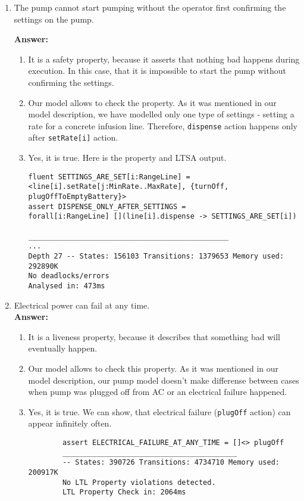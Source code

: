 \documentclass{article}
\begin{document}
\begin{enumerate}
    \item The pump cannot start pumping without the operator first confirming the settings on the pump.
    
    \textbf{Answer:}
    \begin{enumerate}
    \item It is a safety property, because it asserts that nothing bad happens during execution. In this case, that it is impossible to start the pump without confirming the settings.
    \item  Our model allows to check the property. As it was mentioned in our model description, we have modelled only one type of settings - setting a rate for a concrete infusion line. Therefore, \verb|dispense| action happens only after \verb|setRate[i]| action.
    \item Yes, it is true. Here is the property and LTSA output.
	\begin{verbatim}
fluent SETTINGS_ARE_SET[i:RangeLine] =
<line[i].setRate[j:MinRate..MaxRate], {turnOff, plugOffToEmptyBattery}>
assert DISPENSE_ONLY_AFTER_SETTINGS =
forall[i:RangeLine] [](line[i].dispense -> SETTINGS_ARE_SET[i])

_______________________________________________
...
Depth 27 -- States: 156103 Transitions: 1379653 Memory used: 292890K
No deadlocks/errors
Analysed in: 473ms
	\end{verbatim}    
    \end{enumerate}
    
    \item Electrical power can fail at any time.\\
    \textbf{Answer:}
    \begin{enumerate}
    	\item It is a liveness property, because it describes that something bad will eventually happen.
    	\item Our model allows to check this property. As it was mentioned in our model description, our pump model doesn't make differense between cases when pump was plugged off from AC or an electrical failure happened.
    	\item Yes, it is true. We can show, that electrical failure (\verb|plugOff| action) can appear infinitely often.
    	
    	\begin{verbatim}
    	assert ELECTRICAL_FAILURE_AT_ANY_TIME = []<> plugOff
    	_________________________________________
    	-- States: 390726 Transitions: 4734710 Memory used: 200917K
    	No LTL Property violations detected.
    	LTL Property Check in: 2064ms
    	\end{verbatim}
    \end{enumerate}
     


\end{enumerate}
\end{document}
